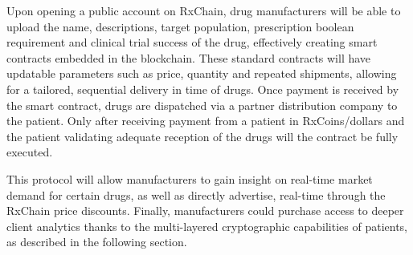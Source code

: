 
Upon opening a public account on RxChain, drug manufacturers will be
able to upload the name, descriptions, target population, prescription boolean
requirement and clinical trial success of the drug,
effectively creating smart contracts embedded in the blockchain. These
standard contracts will have updatable parameters such as price,
quantity and repeated shipments, allowing for a tailored, sequential
delivery in time of drugs.
Once payment is received by the smart contract, drugs are dispatched
via a partner distribution company to the patient. Only after
receiving payment from a patient in RxCoins/dollars and the patient
validating adequate reception of the drugs will the contract be fully
executed.

This protocol will allow manufacturers to gain insight on real-time
market demand for certain drugs,
as well as directly advertise, real-time through the RxChain price discounts. 
Finally, manufacturers could purchase access to deeper client
analytics thanks to the multi-layered cryptographic capabilities of
patients,
as described in the following section.
